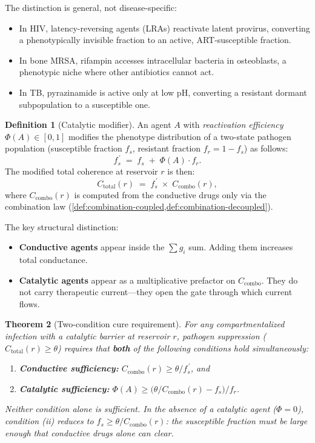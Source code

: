 \documentclass[11pt]{article}
\theoremstyle{plain}
\newtheorem{theorem}{Theorem}[section]
\theoremstyle{definition}
\newtheorem{definition}[theorem]{Definition}
\newcommand{\Ccombo}{C_{\mathrm{combo}}}
\begin{document}
The distinction is general, not disease-specific:
\begin{itemize}
  \item In HIV, latency-reversing agents (LRAs) reactivate latent
    provirus, converting a phenotypically invisible fraction to an
    active, ART-susceptible fraction.
  \item In bone MRSA, rifampin accesses intracellular bacteria in
    osteoblasts, a phenotypic niche where other antibiotics cannot
    act.
  \item In TB, pyrazinamide is active only at low pH, converting a
    resistant dormant subpopulation to a susceptible one.
\end{itemize}

\begin{definition}[Catalytic modifier]
\label{def:catalytic}
An agent $A$ with \emph{reactivation efficiency}
$\Phi(A) \in [0, 1]$ modifies the phenotype distribution of a
two-state pathogen population (susceptible fraction $f_s$,
resistant fraction $f_r = 1 - f_s$) as follows:
\begin{equation}
  \label{eq:catalytic}
  f_s^{\,\prime} \;=\; f_s \;+\; \Phi(A) \cdot f_r.
\end{equation}
The modified total coherence at reservoir $r$ is then:
\begin{equation}
  \label{eq:c-total-catalytic}
  C_{\mathrm{total}}(r) \;=\; f_s^{\,\prime} \;\times\;
  \Ccombo(r),
\end{equation}
where $\Ccombo(r)$ is computed from the conductive drugs only
via the combination law (\cref{def:combination-coupled,def:combination-decoupled}).
\end{definition}

The key structural distinction:
\begin{itemize}
  \item \textbf{Conductive agents} appear inside the
    $\sum g_i$ sum. Adding them increases total conductance.
  \item \textbf{Catalytic agents} appear as a multiplicative
    prefactor on $\Ccombo$. They do not carry therapeutic
    current---they open the gate through which current flows.
\end{itemize}

\begin{theorem}[Two-condition cure requirement]
\label{thm:two-condition}
For any compartmentalized infection with a catalytic barrier at
reservoir $r$, pathogen suppression ($C_{\mathrm{total}}(r) \geq
\theta$) requires that \textbf{both} of the following conditions
hold simultaneously:
\begin{enumerate}[label=(\roman*)]
  \item \textbf{Conductive sufficiency:}
    $\Ccombo(r) \geq \theta / f_s^{\,\prime}$, and
  \item \textbf{Catalytic sufficiency:}
    $\Phi(A) \geq \bigl(\theta / \Ccombo(r) - f_s\bigr) / f_r$.
\end{enumerate}
Neither condition alone is sufficient. In the absence of a
catalytic agent ($\Phi = 0$), condition (ii) reduces to
$f_s \geq \theta / \Ccombo(r)$: the susceptible fraction must be
large enough that conductive drugs alone can clear.
\end{theorem}
\end{document}
